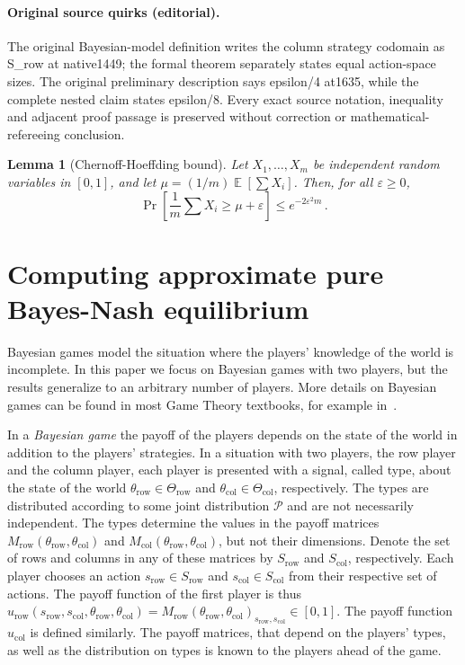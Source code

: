 \documentclass[10pt]{article}
\newtheorem{lemma}[theorem]{Lemma}
\theoremstyle{definition}
\numberwithin{equation}{section}
\newcommand{\eps}{\varepsilon}
\DeclareMathOperator*{\E}{\mathbb{E}}
\newcommand{\Ta}{\Theta}
\newcommand{\ta}{\theta}
\newcommand{\cP}{{\mathcal P}}
\begin{document}
\paragraph{Original source quirks (editorial).} The original Bayesian-model definition writes the column strategy codomain as S\_row at native1449; the formal theorem separately states equal action-space sizes. The original preliminary description says epsilon/4 at1635, while the complete nested claim states epsilon/8. Every exact source notation, inequality and adjacent proof passage is preserved without correction or mathematical-refereeing conclusion.
\clearpage
\setcounter{section}{2}\setcounter{theorem}{0}
\begin{lemma}[Chernoff-Hoeffding bound]
  \label{lemma:chernoff}
  Let $X_1, \ldots, X_m$ be independent random variables in $[0,1]$, and let
  $\mu = ({1}/{m}) \E[ \sum X_i]$.  Then, for all $\eps \ge 0$,
  $$
  \Pr\left[ \frac{1}{m} \sum X_i \ge \mu + \eps \right] \le e^{-2\eps^2 m}\,.
  $$
\end{lemma}
\setcounter{section}{5}
\section{Computing approximate pure Bayes-Nash equilibrium}
\label{sec:bayes}

Bayesian games model the situation where the players' knowledge of the
world is incomplete.  In this paper we focus on Bayesian games
with two players, but the results generalize to an arbitrary number of
players. More details on Bayesian games can be found in most Game
Theory textbooks, for example in~\cite{FudenbergTirole}.

In a \emph{Bayesian game} the payoff of the players depends on the
state of the world in addition to the players' strategies. In a
situation with two players, the row player and the column player, each player is presented with
a signal, called type, about the state of the world $\ta_{\mathrm{row}}\in \Ta_{\mathrm{row}}$
and $\ta_\mathrm{col}\in\Ta_\mathrm{col}$, respectively.  The types are distributed
according to some joint distribution $\cP$ and are not necessarily
independent. The types determine the values in the payoff matrices $M_{\mathrm{row}}(\ta_{\mathrm{row}},\ta_\mathrm{col})$ and $M_\mathrm{col}(\ta_{\mathrm{row}},\ta_\mathrm{col})$, but not their dimensions. Denote 
the set of rows and columns in any of these matrices by $S_{\mathrm{row}}$ and $S_\mathrm{col}$, respectively.
 Each player chooses an action $s_{\mathrm{row}}\in S_{\mathrm{row}}$ and $s_\mathrm{col}\in
S_\mathrm{col}$ from their respective set of actions.
The payoff function of the first player is thus $u_{\mathrm{row}}(s_{\mathrm{row}},s_\mathrm{col},\ta_{\mathrm{row}},\ta_\mathrm{col})=M_{\mathrm{row}}(\ta_{\mathrm{row}},\ta_\mathrm{col})_{s_{\mathrm{row}},s_\mathrm{col}}\in
[0,1]$. The payoff function $u_\mathrm{col}$ is defined similarly.
The payoff matrices, that depend on the players' types, as well as the distribution on types is known to the players
ahead of the game. 
\end{document}
